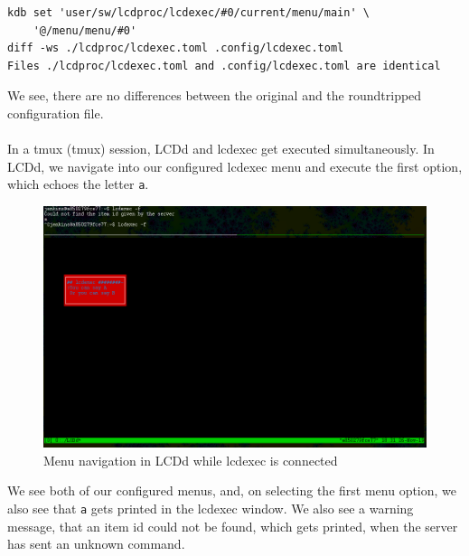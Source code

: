 \documentclass[draft,final]{vutinfth} %
\begin{document}
\begin{Verbatim}[frame=single, fontsize=\small]
kdb set 'user/sw/lcdproc/lcdexec/#0/current/menu/main' \
	'@/menu/menu/#0'
diff -ws ./lcdproc/lcdexec.toml .config/lcdexec.toml 
Files ./lcdproc/lcdexec.toml and .config/lcdexec.toml are identical
\end{Verbatim}
We see, there are no differences between the original and the roundtripped configuration file.
\\\\
In a \acrshort{tmux} (\acrlong{tmux}) session, LCDd and lcdexec get executed simultaneously.
In LCDd, we navigate into our configured lcdexec menu and execute the first option, which echoes the letter \texttt{a}.
\FloatBarrier
\begin{figure}[!ht]
	\centering
		\includegraphics[width=\linewidth]{graphics/lcdexec_menu.png}
  \caption{Menu navigation in LCDd while lcdexec is connected}
\label{fig:lcdexec}
\end{figure}
\FloatBarrier
We see both of our configured menus, and, on selecting the first menu option, we also see that \texttt{a} gets printed in the lcdexec window.
We also see a warning message, that an item id could not be found, which gets printed, when the server has sent an unknown command.
\end{document}

